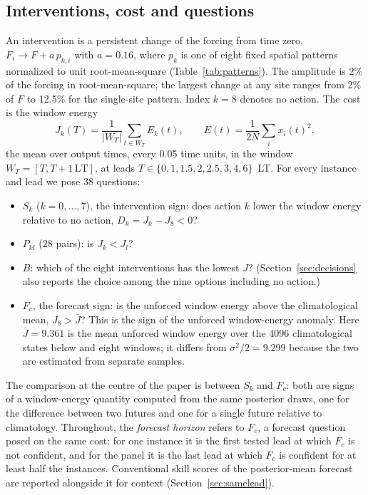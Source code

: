 \documentclass[11pt]{article}
\newcommand{\LT}{\mathrm{LT}}
\newcommand{\Jbar}{\bar J}
\begin{document}
\subsection{Interventions, cost and questions}
An intervention is a persistent change of the forcing from time zero, $F_i \to F + a\,p_{k,i}$ with $a = 0.16$, where $p_k$ is one of eight fixed spatial patterns normalized to unit root-mean-square (Table~\ref{tab:patterns}). The amplitude is 2\% of the forcing in root-mean-square; the largest change at any site ranges from 2\% of $F$ to 12.5\% for the single-site pattern. Index $k = 8$ denotes no action. The cost is the window energy
\begin{equation}
J_k(T) = \frac{1}{|W_T|}\sum_{t \in W_T} E_k(t), \qquad E(t) = \frac{1}{2N}\sum_{i} x_i(t)^2,
\end{equation}
the mean over output times, every 0.05 time units, in the window $W_T = [T, T + 1\,\LT]$, at leads $T \in \{0, 1, 1.5, 2, 2.5, 3, 4, 6\}$~LT. For every instance and lead we pose 38 questions:
\begin{itemize}
\item $S_k$ ($k = 0,\dots,7$), the intervention sign: does action $k$ lower the window energy relative to no action, $D_k = J_k - J_8 < 0$?
\item $P_{kl}$ (28 pairs): is $J_k < J_l$?
\item $B$: which of the eight interventions has the lowest $J$? (Section~\ref{sec:decisions} also reports the choice among the nine options including no action.)
\item $F_c$, the forecast sign: is the unforced window energy above the climatological mean, $J_8 > \Jbar$? This is the sign of the unforced window-energy anomaly. Here $\Jbar = 9.361$ is the mean unforced window energy over the 4096 climatological states below and eight windows; it differs from $\sigma^2/2 = 9.299$ because the two are estimated from separate samples.
\end{itemize}
The comparison at the centre of the paper is between $S_k$ and $F_c$: both are signs of a window-energy quantity computed from the same posterior draws, one for the difference between two futures and one for a single future relative to climatology. Throughout, the \emph{forecast horizon} refers to $F_c$, a forecast question posed on the same cost: for one instance it is the first tested lead at which $F_c$ is not confident, and for the panel it is the last lead at which $F_c$ is confident for at least half the instances. Conventional skill scores of the posterior-mean forecast are reported alongside it for context (Section~\ref{sec:samelead}).
\end{document}
